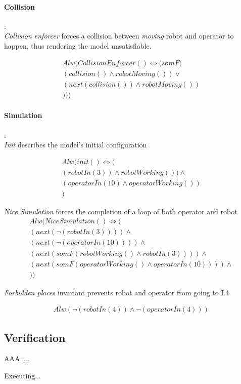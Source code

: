 \paragraph{Collision}:\\

\textit{Collision enforcer} forces a collision between \textit{moving} robot and operator to happen, thus rendering the model unsatisfiable.

\begin{align*}
	Alw(CollisionEnforcer()\iff (somF(\\
	(collision() \land robotMoving())\lor\\
	(next(collision()) \land robotMoving())\\
	)))
\end{align*}


\paragraph{Simulation}:\\

\textit{Init} describes the model's initial configuration

\begin{align*}
	Alw(init()\iff (\\
	(robotIn(3))\land robotWorking())\land \\
	(operatorIn(10)\land operatorWorking()) \\
	)
\end{align*}


\textit{Nice Simulation} forces the completion of a loop of both operator and robot
\begin{align*}
	Alw(NiceSimulation()\iff (\\
	(next(\neg(robotIn(3)))) \land \\
	(next(\neg(operatorIn(10)))) \land \\
	(next(somF(robotWorking()\land robotIn(3)))) \land \\
	(next(somF(operatorWorking()\land operatorIn(10)))) \land \\
	))
\end{align*}

\textit{Forbidden places} invariant prevents robot and operator from going to L4

\begin{align*}
	Alw(\neg(robotIn(4)) \land \neg(operatorIn(4)))
\end{align*}


\subsection{Verification}
AAA.....
\vspace{10mm}

Executing...